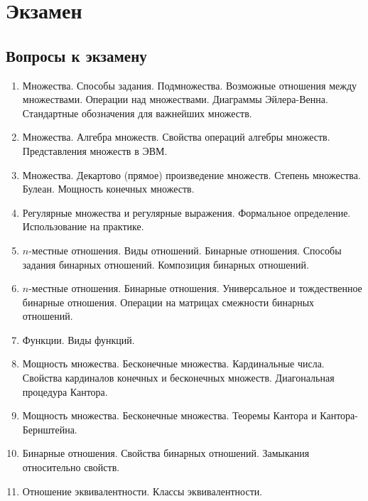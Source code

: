 \chapter{Экзамен}


\section{Вопросы к экзамену}

\begin{enumerate}
    \item Множества. Способы задания. Подмножества. Возможные отношения между множествами. Операции над множествами. Диаграммы Эйлера-Венна. Стандартные обозначения для важнейших множеств.
    
    \item Множества. Алгебра множеств. Свойства операций алгебры множеств. Представления множеств в ЭВМ.
    
    \item Множества. Декартово (прямое) произведение множеств. Степень множества. Булеан. Мощность конечных множеств.
    
    \item Регулярные множества и регулярные выражения. Формальное определение. Использование на практике.
    
    \item $n$-местные отношения. Виды отношений. Бинарные отношения. Способы задания бинарных отношений. Композиция бинарных отношений.
    
    \item $n$-местные отношения. Бинарные отношения. Универсальное и тождественное бинарные отношения. Операции на матрицах смежности бинарных отношений.
    
    \item Функции. Виды функций.
    
    \item Мощность множества. Бесконечные множества. Кардинальные числа. Свойства кардиналов конечных и бесконечных множеств. Диагональная процедура Кантора.
    
    \item Мощность множества. Бесконечные множества. Теоремы Кантора и Кантора-Бернштейна.
    
    \item Бинарные отношения. Свойства бинарных отношений. Замыкания относительно свойств.
    
    \item Отношение эквивалентности. Классы эквивалентности.
    

\end{enumerate}
